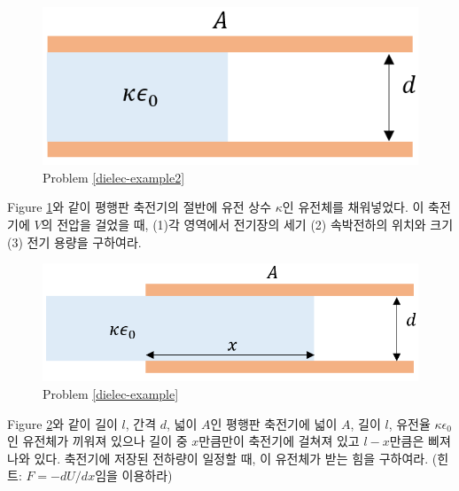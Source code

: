 \begin{problem}\label{dielec-example2}
\begin{figure}[h]
\centering\includegraphics[scale=0.4]{Pictures/dielectric2.PNG}
\caption{Problem \ref{dielec-example2}}
\label{fig:dielec-example2} %
\end{figure}
Figure \ref{fig:dielec-example2}와 같이 평행판 축전기의 절반에 유전 상수 $\kappa$인 유전체를 채워넣었다. 이 축전기에 $V$의 전압을 걸었을 때, (1)각 영역에서 전기장의 세기 (2) 속박전하의 위치와 크기 (3) 전기 용량을 구하여라.
\end{problem}

\begin{problem}\label{dielec-example}
\begin{figure}[h]
\centering\includegraphics[scale=0.4]{Pictures/dielectric.PNG}
\caption{Problem \ref{dielec-example}}
\label{fig:dielec-example} %
\end{figure}
Figure \ref{fig:dielec-example}와 같이 길이 $l$, 간격 $d$, 넓이 $A$인 평행판 축전기에 넓이 $A$, 길이 $l$, 유전율 $\kappa\epsilon_0$인 유전체가 끼워져 있으나 길이 중 $x$만큼만이 축전기에 걸쳐져 있고 $l-x$만큼은 삐져나와 있다. 축전기에 저장된 전하량이 일정할 때, 이 유전체가 받는 힘을 구하여라. (힌트: $F=-dU/dx$임을 이용하라)
\end{problem}

